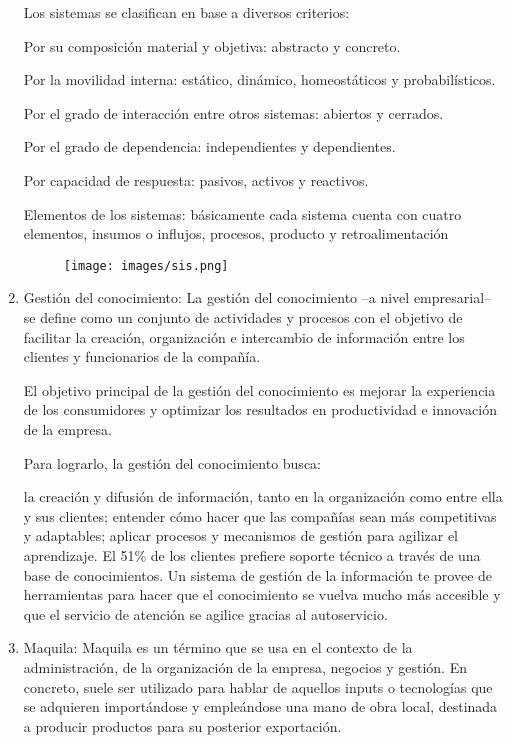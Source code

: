 \documentclass[letterpaper,12pt]{article}
\begin{document}
\begin{sloppypar}
\begin{enumerate}
    Los sistemas se clasifican en base a diversos criterios:
    
    Por su composición material y objetiva: abstracto y concreto.
    
    Por la movilidad interna: estático, dinámico, homeostáticos y probabilísticos.
    
    Por el grado de interacción entre otros sistemas: abiertos y cerrados.
    
    Por el grado de dependencia: independientes y dependientes.
    
    Por capacidad de respuesta: pasivos, activos y reactivos. 
    
    Elementos de los sistemas: básicamente cada sistema cuenta con cuatro elementos, insumos o influjos, procesos, producto y retroalimentación

    \begin{figure}[H]
        \centering 
        \texttt{[image: images/sis.png]}
    \end{figure}
    \item Gestión del conocimiento: La gestión del conocimiento –a nivel empresarial– se define como un conjunto de actividades y procesos con el objetivo de facilitar la creación, organización e intercambio de información entre los clientes y funcionarios de la compañía.

    El objetivo principal de la gestión del conocimiento es mejorar la experiencia de los consumidores y optimizar los resultados en productividad e innovación de la empresa.

    Para lograrlo, la gestión del conocimiento busca:
    
    la creación y difusión de información, tanto en la organización como entre ella y sus clientes;
    entender cómo hacer que las compañías sean más competitivas y adaptables;
    aplicar procesos y mecanismos de gestión para agilizar el aprendizaje.
    El 51\% de los clientes prefiere soporte técnico a través de una base de conocimientos. Un sistema de gestión de la información te provee de herramientas para hacer que el conocimiento se vuelva mucho más accesible y que el servicio de atención se agilice gracias al autoservicio.

    \item Maquila: Maquila es un término que se usa en el contexto de la administración, de la organización de la empresa, negocios y gestión. En concreto, suele ser utilizado para hablar de aquellos inputs o tecnologías que se adquieren importándose y empleándose una mano de obra local, destinada a producir productos para su posterior exportación.


\end{enumerate}
\end{sloppypar}
\end{document}
